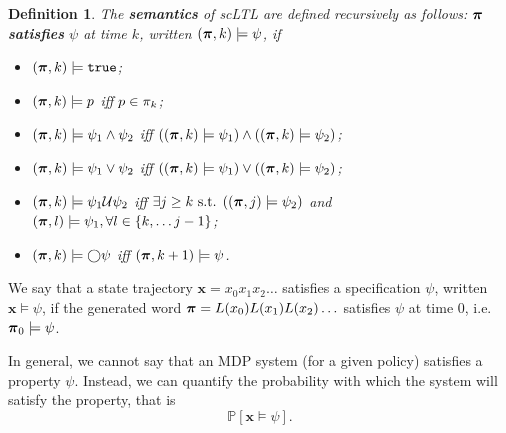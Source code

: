 \documentclass[draft,conference]{IEEEtran}
\newtheorem{definition}{Definition}
\newcommand{\sofieNew}[1]{{\color{blue}#1}}
\begin{document}
\begin{definition}
 The \textbf{semantics} of scLTL are defined recursively as follows: $\boldsymbol{\pi}$ \textbf{satisfies} $\psi$ at time $k$, written $(\boldsymbol{\pi}, k) \models \psi$, if
 \begin{itemize}
    \item $(\boldsymbol{\pi}, k) \models \texttt{true}$;
    \item $(\boldsymbol{\pi}, k) \models p$ iff $p \in \pi_k$;
    \item $(\boldsymbol{\pi}, k) \models \psi_1 \land  \psi_2  $ iff $ ( (\boldsymbol{\pi}, k) \models \psi_1 ) \land ( (\boldsymbol{\pi}, k) \models \psi_2 ) $;
    \item $(\boldsymbol{\pi}, k) \models \psi_1 \lor  \psi_2  $ iff $ ( (\boldsymbol{\pi}, k) \models \psi_1 ) \lor ( (\boldsymbol{\pi}, k) \models \psi_2 ) $;
    \item $(\boldsymbol{\pi}, k) \models  \psi_1 \mathcal{U} \psi_2 $ iff $\exists j \geq k \text{ s.t. } ((\boldsymbol{\pi}, j) \models \psi_2 ) $ and $(\boldsymbol{\pi}, l) \models \psi_1, \forall l \in \{k, \ldots j-1\}$;
    \item $(\boldsymbol{\pi}, k) \models \bigcirc \psi$ iff $(\boldsymbol{\pi}, k+1) \models \psi$.
 \end{itemize}

\end{definition}

We say that a state trajectory $\mathbf{x} = x_0 x_1 x_2 \ldots$ satisfies a specification $\psi$, written $\mathbf{x} \models \psi$, if the generated word $\boldsymbol{\pi} =L(x_0) L(x_1) L(x_2) \ldots$ satisfies $\psi$ at time 0, i.e. $\boldsymbol{\pi}_0 \models \psi$.

\sofieNew{In general, we cannot say that an MDP system (for a given policy) satisfies a property $\psi$. Instead, we can quantify the probability with which the system will satisfy the property, that is  \[\mathbb P[\mathbf x \vDash \psi ] .\]
}


\end{document}
